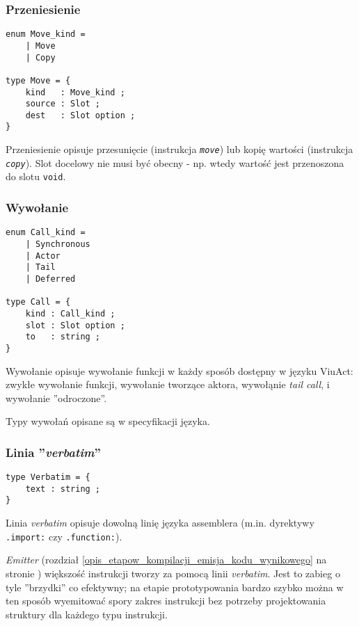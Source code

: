 \subsubsection{Przeniesienie}
\label{diagram_klas_przeniesienie}

\begin{lstlisting}
enum Move_kind =
    | Move
    | Copy

type Move = {
    kind   : Move_kind ;
    source : Slot ;
    dest   : Slot option ;
}
\end{lstlisting}

Przeniesienie opisuje przesunięcie (instrukcja \emph{\texttt{move}}) lub kopię wartości (instrukcja
\emph{\texttt{copy}}). Slot docelowy nie musi być obecny - np. wtedy wartość jest przenoszona do slotu
\texttt{void}.

\subsubsection{Wywołanie}
\label{diagram_klas_wywolanie}

\begin{lstlisting}
enum Call_kind =
    | Synchronous
    | Actor
    | Tail
    | Deferred

type Call = {
    kind : Call_kind ;
    slot : Slot option ;
    to   : string ;
}
\end{lstlisting}

Wywołanie opisuje wywołanie funkcji w każdy sposób dostępny w języku ViuAct: zwykłe wywołanie funkcji,
wywołanie tworzące aktora, wywołąnie \emph{tail call}, i wywołanie ''odroczone''.

Typy wywołań opisane są w specyfikacji języka.

\subsubsection{Linia ''\emph{verbatim}''}
\label{diagram_klas_linia_verbatim}

\begin{lstlisting}
type Verbatim = {
    text : string ;
}
\end{lstlisting}

Linia \emph{verbatim} opisuje dowolną linię języka assemblera (m.in. dyrektywy \texttt{.import:} czy
\texttt{.function:}).

\emph{Emitter} (rozdział \ref{opis_etapow_kompilacji_emisja_kodu_wynikowego} na stronie
\pageref{opis_etapow_kompilacji_emisja_kodu_wynikowego}) większość instrukcji tworzy za pomocą linii
\emph{verbatim}. Jest to zabieg o tyle ''brzydki'' co efektywny; na etapie prototypowania bardzo szybko
można w ten sposób wyemitować spory zakres instrukcji bez potrzeby projektowania struktury dla każdego typu
instrukcji.

